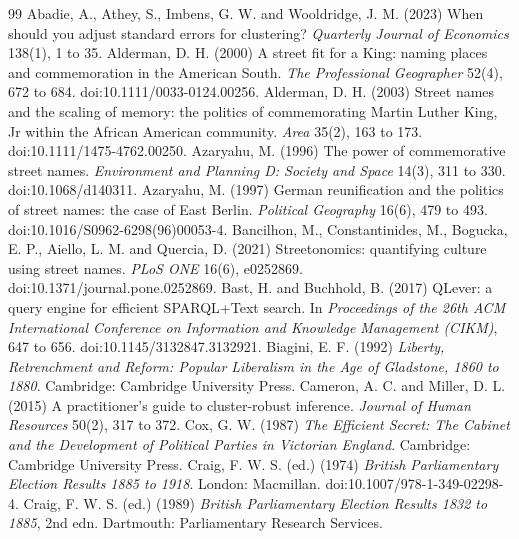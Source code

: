 \documentclass[11pt,a4paper]{article}
\begin{document}
\begin{thebibliography}{99}
 Abadie, A., Athey, S., Imbens, G. W. and Wooldridge, J. M. (2023) When should you adjust standard errors for clustering? \textit{Quarterly Journal of Economics} 138(1), 1 to 35.
 Alderman, D. H. (2000) A street fit for a King: naming places and commemoration in the American South. \textit{The Professional Geographer} 52(4), 672 to 684. doi:10.1111/0033-0124.00256.
 Alderman, D. H. (2003) Street names and the scaling of memory: the politics of commemorating Martin Luther King, Jr within the African American community. \textit{Area} 35(2), 163 to 173. doi:10.1111/1475-4762.00250.
 Azaryahu, M. (1996) The power of commemorative street names. \textit{Environment and Planning D: Society and Space} 14(3), 311 to 330. doi:10.1068/d140311.
 Azaryahu, M. (1997) German reunification and the politics of street names: the case of East Berlin. \textit{Political Geography} 16(6), 479 to 493. doi:10.1016/S0962-6298(96)00053-4.
 Bancilhon, M., Constantinides, M., Bogucka, E. P., Aiello, L. M. and Quercia, D. (2021) Streetonomics: quantifying culture using street names. \textit{PLoS ONE} 16(6), e0252869. doi:10.1371/journal.pone.0252869.
 Bast, H. and Buchhold, B. (2017) QLever: a query engine for efficient SPARQL+Text search. In \textit{Proceedings of the 26th ACM International Conference on Information and Knowledge Management (CIKM)}, 647 to 656. doi:10.1145/3132847.3132921.
 Biagini, E. F. (1992) \textit{Liberty, Retrenchment and Reform: Popular Liberalism in the Age of Gladstone, 1860 to 1880}. Cambridge: Cambridge University Press.
 Cameron, A. C. and Miller, D. L. (2015) A practitioner's guide to cluster-robust inference. \textit{Journal of Human Resources} 50(2), 317 to 372.
 Cox, G. W. (1987) \textit{The Efficient Secret: The Cabinet and the Development of Political Parties in Victorian England}. Cambridge: Cambridge University Press.
 Craig, F. W. S. (ed.) (1974) \textit{British Parliamentary Election Results 1885 to 1918}. London: Macmillan. doi:10.1007/978-1-349-02298-4.
 Craig, F. W. S. (ed.) (1989) \textit{British Parliamentary Election Results 1832 to 1885}, 2nd edn. Dartmouth: Parliamentary Research Services.

\end{thebibliography}
\end{document}
